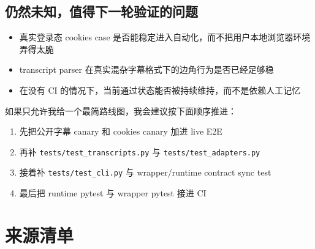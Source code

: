 \documentclass[a4paper]{article}
\begin{document}
\subsection{仍然未知，值得下一轮验证的问题}

\begin{itemize}
\item 真实登录态 cookies case 是否能稳定进入自动化，而不把用户本地浏览器环境弄得太脆
\item transcript parser 在真实混杂字幕格式下的边角行为是否已经足够稳
\item 在没有 CI 的情况下，当前通过状态能否被持续维持，而不是依赖人工记忆
\end{itemize}

如果只允许我给一个最简路线图，我会建议按下面顺序推进：

\begin{enumerate}
\item 先把公开字幕 canary 和 cookies canary 加进 live E2E
\item 再补 \texttt{tests/test\_transcripts.py} 与 \texttt{tests/test\_adapters.py}
\item 接着补 \texttt{tests/test\_cli.py} 与 wrapper/runtime contract sync test
\item 最后把 runtime pytest 与 wrapper pytest 接进 CI
\end{enumerate}

\appendix

\section{来源清单}
\end{document}
